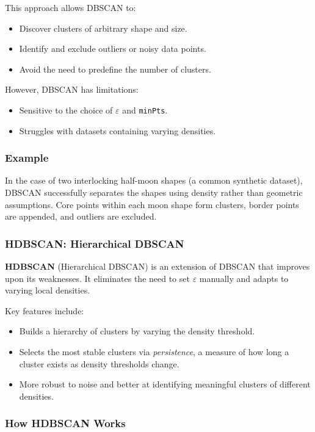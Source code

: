 \documentclass[9pt]{extarticle}
\begin{document}
This approach allows DBSCAN to:
\begin{itemize}
    \item Discover clusters of arbitrary shape and size.
    \item Identify and exclude outliers or noisy data points.
    \item Avoid the need to predefine the number of clusters.
\end{itemize}

However, DBSCAN has limitations:
\begin{itemize}
    \item Sensitive to the choice of $\varepsilon$ and \texttt{minPts}.
    \item Struggles with datasets containing varying densities.
\end{itemize}

\subsubsection{Example}

In the case of two interlocking half-moon shapes (a common synthetic dataset), DBSCAN successfully separates the shapes using density rather than geometric assumptions. Core points within each moon shape form clusters, border points are appended, and outliers are excluded.

\subsubsection{HDBSCAN: Hierarchical DBSCAN}

\textbf{HDBSCAN} (Hierarchical DBSCAN) is an extension of DBSCAN that improves upon its weaknesses. It eliminates the need to set $\varepsilon$ manually and adapts to varying local densities.

Key features include:
\begin{itemize}
    \item Builds a hierarchy of clusters by varying the density threshold.
    \item Selects the most stable clusters via \textit{persistence}, a measure of how long a cluster exists as density thresholds change.
    \item More robust to noise and better at identifying meaningful clusters of different densities.
\end{itemize}

\subsubsection{How HDBSCAN Works}
\end{document}
